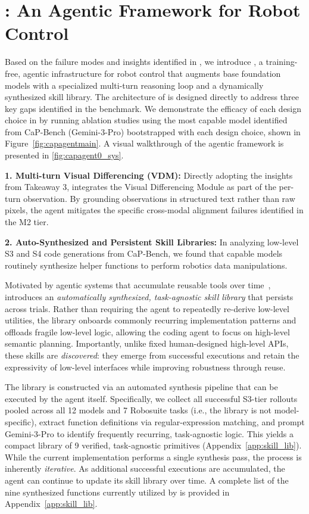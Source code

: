\section{\sysname{}: An Agentic Framework for Robot Control}
\label{sec:capagent}
Based on the failure modes and insights identified in \benchname{}, we introduce \textbf{\sysname{}}, a training-free, agentic infrastructure for robot control that augments base foundation models with a specialized multi-turn reasoning loop and a dynamically synthesized skill library.
The architecture of \sysname{} is designed directly to address three key gaps identified in the benchmark.
We demonstrate the efficacy of each design choice in \sysname{} by running ablation studies using the most capable model identified from CaP-Bench (Gemini-3-Pro) bootstrapped with each design choice, shown in Figure~\ref{fig:capagentmain}. A visual walkthrough of the agentic framework is presented in \cref{fig:capagent0_sys}.


\textbf{1. Multi-turn Visual Differencing (VDM):}
Directly adopting the insights from Takeaway 3, \sysname{} integrates the Visual Differencing Module as part of the per-turn observation. By grounding observations in structured text rather than raw pixels, the agent mitigates the specific cross-modal alignment failures identified in the M2 tier.

\textbf{2. Auto-Synthesized and Persistent Skill Libraries:}
In analyzing low-level S3 and S4 code generations from CaP-Bench, we found that capable models routinely synthesize helper functions to perform robotics data manipulations.

Motivated by agentic systems that accumulate reusable tools over time~\cite{wang2023voyager}, \textbf{\sysname{}} introduces an \textit{automatically synthesized, task-agnostic skill library} that persists across trials. Rather than requiring the agent to repeatedly re-derive low-level utilities, the library onboards commonly recurring implementation patterns and offloads fragile low-level logic, allowing the coding agent to focus on high-level semantic planning. Importantly, unlike fixed human-designed high-level APIs, these skills are \emph{discovered}: they emerge from successful executions and retain the expressivity of low-level interfaces while improving robustness through reuse.

The library is constructed via an automated synthesis pipeline that can be executed by the agent itself. Specifically, we collect all successful S3-tier rollouts pooled across all 12 models and 7 Robosuite tasks (i.e., the library is not model-specific), extract function definitions via regular-expression matching, and prompt Gemini-3-Pro to identify frequently recurring, task-agnostic logic. This yields a compact library of 9 verified, task-agnostic primitives (Appendix~\ref{app:skill_lib}).
While the current implementation performs a single synthesis pass, the process is inherently \emph{iterative}. As additional successful executions are accumulated, the agent can continue to update its skill library over time. 
A complete list of the nine synthesized functions currently utilized by \sysname{} is provided in Appendix~\ref{app:skill_lib}.


